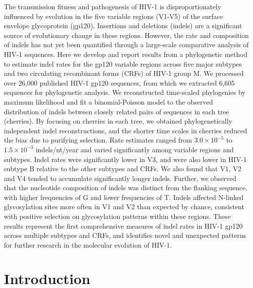 \documentclass[12pt]{article}
\begin{document}
The transmission fitness and pathogenesis of HIV-1 is disproportionately influenced by evolution in the five variable regions (V1-V5) of the surface envelope glycoprotein (gp120).
Insertions and deletions (indels) are a significant source of evolutionary change in these regions.
However, the rate and composition of indels has not yet been quantified through a large-scale comparative analysis of HIV-1 sequences.
Here we develop and report results from a phylogenetic method to estimate indel rates for the gp120 variable regions across five major subtypes and two circulating recombinant forms (CRFs) of HIV-1 group M.
We processed over 26,000 published HIV-1 gp120 sequences, from which we extracted 6,605 sequences for phylogenetic analysis.
We reconstructed time-scaled phylogenies by maximum likelihood and fit a binomial-Poisson model to the observed distribution of indels between closely related pairs of sequences in each tree (cherries).
By focusing on cherries in each tree, we obtained phylogenetically independent indel reconstructions, and the shorter time scales in cherries reduced the bias due to purifying selection.
Rate estimates ranged from $3.0\times 10^{-5}$ to $1.5 \times 10^{-3}$ indels/nt/year and varied significantly among variable regions and subtypes.
Indel rates were significantly lower in V3, and were also lower in HIV-1 subtype B relative to the other subtypes and CRFs.
We also found that V1, V2 and V4 tended to accumulate significantly longer indels.
Further, we observed that the nucleotide composition of indels was distinct from the flanking sequence, with higher frequencies of G and lower frequencies of T.
Indels affected N-linked glycosylation sites more often in V1 and V2 than expected by chance, consistent with positive selection on glycosylation patterns within these regions.
These results represent the first comprehensive measures of indel rates in HIV-1 gp120 across multiple subtypes and CRFs, and identifies novel and unexpected patterns for further research in the molecular evolution of HIV-1.




\clearpage

\section * {Introduction}
\end{document}
